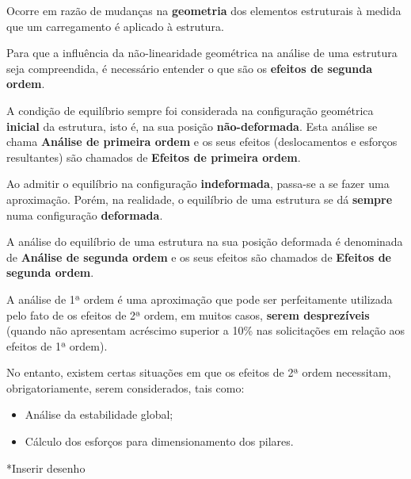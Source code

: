 Ocorre em razão de mudanças na \textbf{geometria} dos elementos estruturais à medida que um carregamento é aplicado à estrutura.

Para que a influência da não-linearidade geométrica na análise de uma estrutura seja compreendida, é necessário entender o que são os \textbf{efeitos de segunda ordem}.

A condição de equilíbrio sempre foi considerada na configuração geométrica \textbf{inicial} da estrutura, isto é, na sua posição \textbf{não-deformada}. Esta análise se chama \textbf{Análise de primeira ordem} e os seus efeitos (deslocamentos e esforços resultantes) são chamados de \textbf{Efeitos de primeira ordem}.

Ao admitir o equilíbrio na configuração \textbf{indeformada}, passa-se a se fazer uma aproximação. Porém, na realidade, o equilíbrio de uma estrutura se dá \textbf{sempre} numa configuração \textbf{deformada}.

A análise do equilíbrio de uma estrutura na sua posição deformada é denominada de \textbf{Análise de segunda ordem} e os seus efeitos são chamados de \textbf{Efeitos de segunda ordem}.

A análise de 1ª ordem é uma aproximação que pode ser perfeitamente utilizada pelo fato de os efeitos de 2ª ordem, em muitos casos, \textbf{serem desprezíveis} (quando não apresentam acréscimo superior a 10\% nas solicitações em relação aos efeitos de 1ª ordem).

No entanto, existem certas situações em que os efeitos de 2ª ordem necessitam, obrigatoriamente, serem considerados, tais como:

\begin{itemize}
	\item Análise da estabilidade global;
	\item Cálculo dos esforços para dimensionamento dos pilares.
\end{itemize}

*Inserir desenho